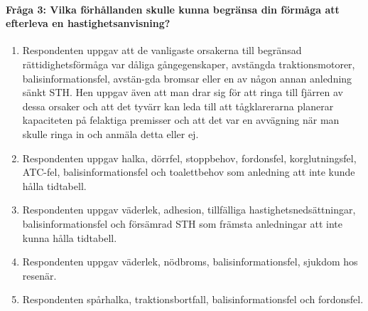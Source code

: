 \paragraph{Fråga 3: Vilka förhållanden skulle kunna begränsa din förmåga att efterleva en hastighetsanvisning?}
\begin{enumerate}
    \item Respondenten uppgav att de vanligaste orsakerna till begränsad rättidighetsförmåga var dåliga gångegenskaper, avstängda traktionsmotorer, balisinformationsfel, avstän-gda bromsar eller en av någon annan anledning sänkt STH\@.
    Hen uppgav även att man drar sig för att ringa till fjärren av dessa orsaker och att det tyvärr kan leda till att tågklarerarna planerar kapaciteten på felaktiga premisser och att det var en avvägning när man skulle ringa in och anmäla detta eller ej.
    \item Respondenten uppgav halka, dörrfel, stoppbehov, fordonsfel, korglutningsfel, ATC-fel, balisinformationsfel och toalettbehov som anledning att inte kunde hålla tidtabell.
    \item Respondenten uppgav väderlek, adhesion, tillfälliga hastighetsnedsättningar, balisinformationsfel och försämrad STH som främsta anledningar att inte kunna hålla tidtabell.
    \item Respondenten uppgav väderlek, nödbroms, balisinformationsfel, sjukdom hos resenär.
    \item Respondenten spårhalka, traktionsbortfall, balisinformationsfel och fordonsfel.
\end{enumerate}

